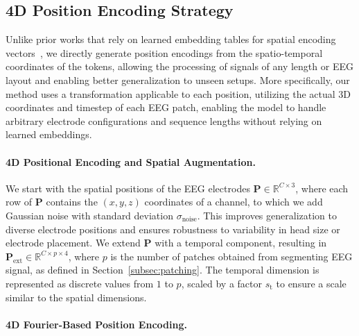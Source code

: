\documentclass{article}
\begin{document}
\subsection{4D Position Encoding Strategy}
\label{subsec:fourier}

Unlike prior works that rely on learned embedding tables for spatial encoding vectors~\citep{jiang2024labram, wang2024cbramod}, we directly generate position encodings from the spatio-temporal coordinates of the tokens, allowing the processing of signals of any length or EEG layout and enabling better generalization to unseen setups. More specifically, our method uses a transformation applicable to each position, utilizing the actual 3D coordinates and timestep of each EEG patch, enabling the model to handle arbitrary electrode configurations and sequence lengths without relying on learned embeddings.

\paragraph{4D Positional Encoding and Spatial Augmentation.}
We start with the spatial positions of the EEG electrodes $\mathbf{P} \in \mathbb{R}^{C \times 3}$, where each row of \(\mathbf{P}\) contains the \((x, y, z)\) coordinates of a channel, to which we add Gaussian noise with standard deviation \(\sigma_{\text{noise}}\). This improves generalization to diverse electrode positions and ensures robustness to variability in head size or electrode placement. We extend $\mathbf{P}$ with a temporal component, resulting in $\mathbf{P}_{\text{ext}} \in \mathbb{R}^{C \times p \times 4}$,
where $p$ is the number of patches obtained from segmenting EEG signal, as defined in Section~\ref{subsec:patching}. The temporal dimension is represented as discrete values from \(1\) to \(p\), scaled by a factor $s_{\text{t}}$ to ensure a scale similar to the spatial dimensions.

\paragraph{4D Fourier-Based Position Encoding.}
\end{document}
